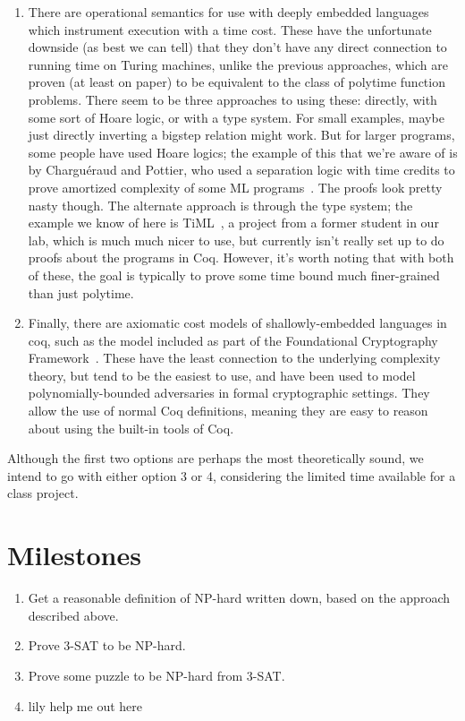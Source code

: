 \documentclass{article}
\begin{document}
\begin{enumerate}
\item There are operational semantics for use with deeply embedded languages
  which instrument execution with a time cost. These have the unfortunate
  downside (as best we can tell) that they don't have any direct connection to
  running time on Turing machines, unlike the previous approaches, which are
  proven (at least on paper) to be equivalent to the class of polytime function
  problems. There seem to be three approaches to using these: directly, with
  some sort of Hoare logic, or with a type system. For small examples, maybe
  just directly inverting a bigstep relation might work. But for larger
  programs, some people have used Hoare logics; the example of this that we're
  aware of is by Charguéraud and Pottier, who used a separation logic with time
  credits to prove amortized complexity of some ML programs~\cite{machine15}.
  The proofs look pretty nasty though. The alternate approach is through the
  type system; the example we know of here is TiML~\cite{timl17}, a project from
  a former student in our lab, which is much much nicer to use, but currently
  isn't really set up to do proofs about the programs in Coq. However, it's
  worth noting that with both of these, the goal is typically to prove some time
  bound much finer-grained than just polytime.

\item Finally, there are axiomatic cost models of shallowly-embedded languages
  in coq, such as the model included as part of the Foundational Cryptography
  Framework~\cite{fcf15}. These have the least connection to the underlying
  complexity theory, but tend to be the easiest to use, and have been used to
  model polynomially-bounded adversaries in formal cryptographic settings. They
  allow the use of normal Coq definitions, meaning they are easy to reason about
  using the built-in tools of Coq.
\end{enumerate}

Although the first two options are perhaps the most theoretically sound, we
intend to go with either option 3 or 4, considering the limited time available
for a class project.

\section{Milestones}

\begin{enumerate}
\item Get a reasonable definition of NP-hard written down, based on the approach
  described above.
\item Prove 3-SAT to be NP-hard.
\item Prove some puzzle to be NP-hard from 3-SAT.
\item lily help me out here
\end{enumerate}
\end{document}
